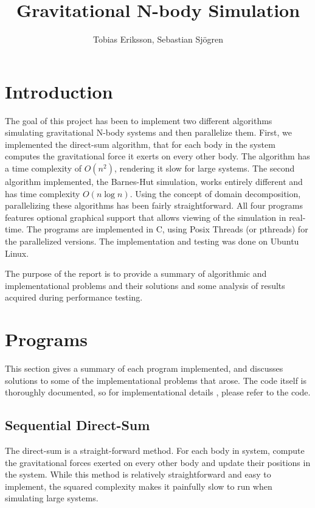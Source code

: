 \documentclass[10pt,a4paper]{article}
\author{Tobias Eriksson, Sebastian Sjögren}
\title{Gravitational N-body Simulation}
\begin{document}
\maketitle

\tableofcontents

\listoffigures

\listoftables

\newpage

\section{Introduction}
The goal of this project has been to implement two different algorithms 
simulating gravitational N-body systems and then parallelize them. 
First, we implemented the direct-sum algorithm, that for each body in the system
computes the gravitational force it exerts on every other body. 
The algorithm has a time complexity of $O(n^2)$, rendering it slow for large systems.
The second algorithm implemented, the Barnes-Hut simulation, works entirely 
different and has time complexity $O(n\log n)$.
Using the concept of domain decomposition, parallelizing these algorithms has been fairly straightforward.
All four programs features optional graphical support that allows viewing of the simulation in real-time. The programs are implemented in C, using Posix Threads (or \textsf{pthreads}) for the parallelized versions. The implementation and testing was done on Ubuntu Linux. 

The purpose of the report is to provide a summary of algorithmic and implementational problems and their solutions and some analysis of results acquired during performance testing.
\section{Programs}
This section gives a summary of each program implemented, and discusses solutions to some of the implementational problems that arose. The code itself is thoroughly documented, so for implementational details , please refer to the code.
\subsection{Sequential Direct-Sum}
The direct-sum is a straight-forward method. For each body in system, compute the gravitational forces exerted on every other body and update their positions in the system. While this method is relatively straightforward and easy to implement, the squared complexity makes it painfully slow to run when simulating large systems.
\end{document}
